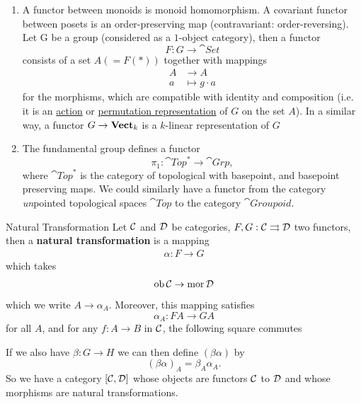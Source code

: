 \documentclass{article}
\begin{document}
\begin{enumerate}
    \item[(g)] A functor between monoids is monoid homomorphism. \gap A covariant functor between posets is an order-preserving map (contravariant: order-reversing). \gap Let G be a group (considered as a $1$-object category), then a functor \[ F : G \to \cat{Set} \] consists of a set $A (=F(*))$ together with mappings \begin{align*}
        A &\to A\\
        a &\mapsto g\cdot a
    \end{align*}
    for the morphisms, which are compatible with identity and composition (i.e. it is an \underline{action} or \underline{permutation representation} of $G$ on the set $A$). \gap In a similar way, a functor $G \rightarrow \textbf{Vect$_{k}$}$ is a $k$-linear representation of $G$
    \item[(h)] The fundamental group defines a functor \[ \pi_{1} : \cat{Top}^{*} \to \cat{Grp},\] where $\cat{Top}^{*}$ is the category of topological with basepoint, and basepoint preserving maps. We could similarly have a functor from the category \textit{un}pointed topological spaces $\cat{Top}$ to the category $\cat{Groupoid}$.
\end{enumerate}
\begin{fancydefine}{Natural Transformation}
    Let $\mathcal{C}$ and $\mathcal{D}$ be categories, $F,G: \mathcal{C} \rightrightarrows \mathcal{D}$ two functors, then a \textbf{natural transformation} is a mapping \begin{align*}
        \alpha : F \to G
    \end{align*}
    which takes
    \begin{align*}
        \operatorname{ob} \mathcal{C} \to \operatorname{mor} \mathcal{D}
    \end{align*}
    which we write $A \to \alpha_{A}$. Moreover, this mapping satisfies \[ \alpha_{A}: FA \to GA \] for all $A$, and for any $f: A \to B$ in $\mathcal{C}$, the following square commutes
    \begin{center}
\end{center}
\end{fancydefine}
If we also have $\beta : G \to H$ we can then define $(\beta \alpha)$ by \[ (\beta \alpha)_{A} = \beta_{A}\alpha_{A}.\]
So we have a category $[\mathcal{C}, \mathcal{D}]$ whose objects are functors $\mathcal{C}$ to $\mathcal{D}$ and whose morphisms are natural transformations.
\end{document}
